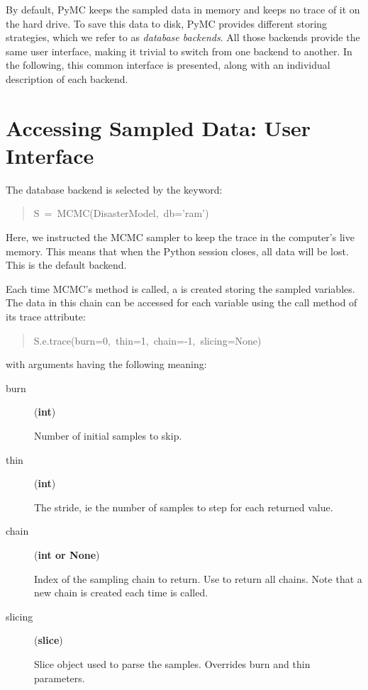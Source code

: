 

By default, PyMC keeps the sampled data in memory and keeps no trace of it on the hard drive. To save this data to disk, PyMC provides different storing strategies, which we refer to as \emph{database backends}. All those backends provide the same user interface, making it trivial to switch from one backend to another. In the following, this common interface is presented, along with an individual description of each backend.



\hypertarget{accessing-sampled-data-user-interface}{}
\section*{Accessing Sampled Data: User Interface}
\label{accessing-sampled-data-user-interface}

The database backend is selected by the  keyword:
\begin{quote}{\ttfamily \raggedright \noindent
S~=~MCMC(DisasterModel,~db='ram')
}\end{quote}

Here, we instructed the MCMC sampler to keep the trace in the computer's live memory. This means that when the Python session closes, all data will be lost. This is the default backend.

Each time MCMC's  method is called, a  is created storing the sampled variables. The data in this chain can be accessed for each variable using the call method of its trace attribute:
\begin{quote}{\ttfamily \raggedright \noindent
S.e.trace(burn=0,~thin=1,~chain=-1,~slicing=None)
}\end{quote}

with arguments having the following meaning:
\begin{description}
\item[{burn}] \leavevmode (\textbf{int})

Number of initial samples to skip.

\item[{thin}] \leavevmode (\textbf{int})

The stride, ie the number of samples to step for each returned value.

\item[{chain}] \leavevmode (\textbf{int or None})

Index of the sampling chain to return. Use  to return all chains. Note that a new chain is created each time  is called.

\item[{slicing}] \leavevmode (\textbf{slice})

Slice object used to parse the samples. Overrides burn and thin parameters.

\end{description}


